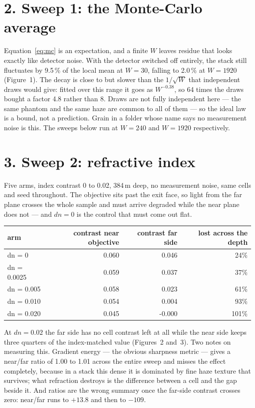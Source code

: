 \documentclass[11pt,a4paper]{article}
\begin{document}
\section*{2. Sweep 1: the Monte-Carlo average}

Equation~\eqref{eq:mc} is an expectation, and a finite $W$ leaves residue that looks
exactly like detector noise. With the detector switched off entirely, the stack still
fluctuates by 9.5\,\% of the local mean at $W = 30$, falling to
2.0\,\% at $W = 1920$ (Figure~1). The decay is close to but slower than the
$1/\sqrt{W}$ that independent draws would give: fitted over this range it goes as
$W^{-0.38}$, so 64 times the draws bought a factor 4.8 rather than 8. Draws are
not fully independent here --- the same phantom and the same haze are common to all of
them --- so the ideal law is a bound, not a prediction. Grain in a folder whose name
says no measurement noise is this. The sweeps below run at $W = 240$ and $W = 1920$
respectively.

\section*{3. Sweep 2: refractive index}

Five arms, index contrast 0 to 0.02, 384\,\textmu m deep, no measurement noise, same
cells and seed throughout. The objective sits past the exit face, so light from the
far plane crosses the whole sample and must arrive degraded while the near plane does
not --- and $dn = 0$ is the control that must come out flat.

\begin{center}
\begin{tabular}{lrrr}
\toprule
arm & contrast near objective & contrast far side & lost across the depth \\
\midrule
dn = 0 & 0.060 & 0.046 & 24\% \\
dn = 0.0025 & 0.059 & 0.037 & 37\% \\
dn = 0.005 & 0.058 & 0.023 & 61\% \\
dn = 0.010 & 0.054 & 0.004 & 93\% \\
dn = 0.020 & 0.045 & -0.000 & 101\% \\
\bottomrule
\end{tabular}
\end{center}

At $dn = 0.02$ the far side has no cell contrast left at all while the near side keeps
three quarters of the index-matched value (Figures~2 and~3). Two notes on measuring this.
Gradient energy --- the obvious sharpness metric --- gives a near/far ratio of 1.00 to
1.01 across the entire sweep and misses the effect completely, because in a stack this
dense it is dominated by fine haze texture that survives; what refraction destroys is
the difference between a cell and the gap beside it. And ratios are the wrong summary
once the far-side contrast crosses zero: near/far runs to $+13.8$ and then to $-109$.
\end{document}
